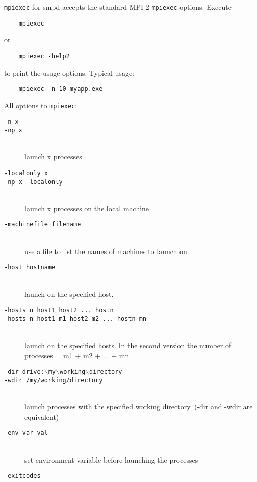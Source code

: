 \documentclass[dvipdfm,11pt]{article}
\begin{document}
\texttt{mpiexec} for smpd accepts the standard MPI-2 \texttt{mpiexec}
options.  Execute
\begin{verbatim}
    mpiexec
\end{verbatim}
or
\begin{verbatim}
    mpiexec -help2
\end{verbatim}
to print the usage options.  Typical usage:
\begin{verbatim}
    mpiexec -n 10 myapp.exe
\end{verbatim}
All options to \texttt{mpiexec}:
\begin{description}
\item[\texttt{-n x}]
\item[\texttt{-np x}]\mbox{}\\
  launch x processes
\item[\texttt{-localonly x}]
\item[\texttt{-np x -localonly}]\mbox{}\\
  launch x processes on the local machine
\item[\texttt{-machinefile filename}]\mbox{}\\
  use a file to list the names of machines to launch on
\item[\texttt{-host hostname}]\mbox{}\\
  launch on the specified host.
\item[\texttt{-hosts n host1 host2 ... hostn}]
\item[\texttt{-hosts n host1 m1 host2 m2 ... hostn mn}]\mbox{}\\
  launch on the specified hosts.
  In the second version the number of processes = m1 + m2 + ... + mn
\item[\texttt{-dir drive:$\backslash$my$\backslash$working$\backslash$directory}]
\item[\texttt{-wdir /my/working/directory}]\mbox{}\\
  launch processes with the specified working directory. (-dir and -wdir are
equivalent)
\item[\texttt{-env var val}]\mbox{}\\
  set environment variable before launching the processes
\item[\texttt{-exitcodes}]\mbox{}\\

\end{description}
\end{document}
